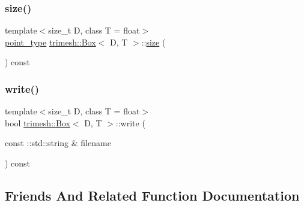 \mbox{\label{classtrimesh_1_1Box_a111c09e2c3fb2b350e9091eb6e61d641}} 
\subsubsection{\texorpdfstring{size()}{size()}}
{\footnotesize\ttfamily template$<$size\+\_\+t D, class T = float$>$ \\
\hyperlink{classtrimesh_1_1Box_a208c806781f96a7001491a275dfa7655}{point\+\_\+type} \hyperlink{classtrimesh_1_1Box}{trimesh\+::\+Box}$<$ D, T $>$\+::\hyperlink{namespacetrimesh_a1c71e2912be63f694df9e9991bddb15e}{size} (\begin{DoxyParamCaption}{ }\end{DoxyParamCaption}) const\hspace{0.3cm}{\ttfamily [inline]}}

\mbox{\label{classtrimesh_1_1Box_a3520a4a6df05071e821bf63cb18d789f}} 
\subsubsection{\texorpdfstring{write()}{write()}}
{\footnotesize\ttfamily template$<$size\+\_\+t D, class T = float$>$ \\
bool \hyperlink{classtrimesh_1_1Box}{trimesh\+::\+Box}$<$ D, T $>$\+::write (\begin{DoxyParamCaption}\item[{const \+::std\+::string \&}]{filename }\end{DoxyParamCaption}) const\hspace{0.3cm}{\ttfamily [inline]}}



\subsection{Friends And Related Function Documentation}
\mbox{\label{classtrimesh_1_1Box_a23d724d489cba7bb23565790189fb659}} 
